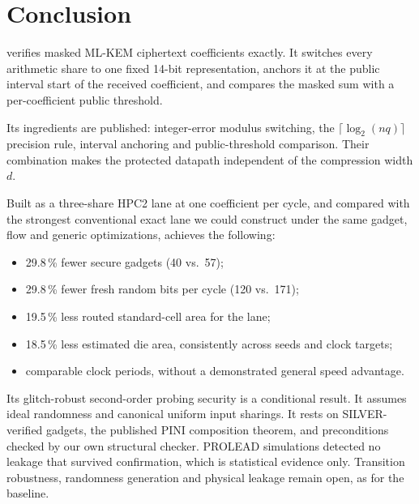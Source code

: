 \section{Conclusion}\label{sec:conclusion}
\PAMS{} verifies masked ML-KEM ciphertext coefficients exactly. It switches every arithmetic share to one fixed 14-bit representation, anchors it at the public interval start of the received coefficient, and compares the masked sum with a per-coefficient public threshold.

Its ingredients are published: integer-error modulus switching, the $\lceil\log_2(nq)\rceil$ precision rule, interval anchoring and public-threshold comparison. Their combination makes the protected datapath independent of the compression width $d$.

Built as a three-share HPC2 lane at one coefficient per cycle, and compared with the strongest conventional exact lane we could construct under the same gadget, flow and generic optimizations, \PAMS{} achieves the following:
\begin{itemize}
  \item 29.8\,\% fewer secure gadgets (40 vs.\ 57);
  \item 29.8\,\% fewer fresh random bits per cycle (120 vs.\ 171);
  \item 19.5\,\% less routed standard-cell area for the lane;
  \item 18.5\,\% less estimated die area, consistently across seeds and clock targets;
  \item comparable clock periods, without a demonstrated general speed advantage.
\end{itemize}

Its glitch-robust second-order probing security is a conditional result. It assumes ideal randomness and canonical uniform input sharings. It rests on SILVER-verified gadgets, the published PINI composition theorem, and preconditions checked by our own structural checker. PROLEAD simulations detected no leakage that survived confirmation, which is statistical evidence only. Transition robustness, randomness generation and physical leakage remain open, as for the baseline.
